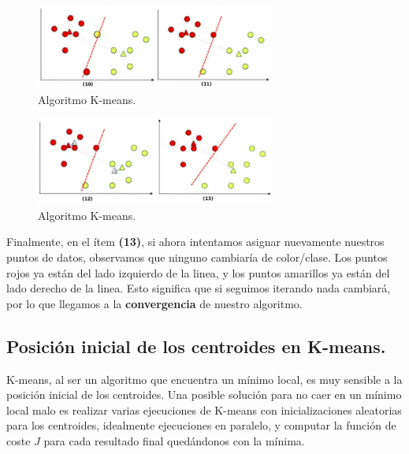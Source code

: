 \documentclass[12pt,a4paper]{article}
\begin{document}
\begin{sloppypar}
\begin{figure}[H]    %
 \centering
 \includegraphics[width=0.7\textwidth]{images/K_Means_5.png}
 \captionsetup{justification=centering,margin=2cm}
 \caption{Algoritmo K-means.}
\end{figure}

\begin{figure}[H]    %
 \centering
 \includegraphics[width=0.7\textwidth]{images/K_Means_6.png}
 \captionsetup{justification=centering,margin=2cm}
 \caption{Algoritmo K-means.}
\end{figure}

Finalmente, en el ítem \textbf{(13)}, si ahora intentamos asignar nuevamente nuestros puntos de datos, observamos que ninguno cambiaría de color/clase. Los puntos rojos ya están del lado izquierdo de la linea, y los puntos amarillos ya están del lado derecho de la linea. Esto significa que si seguimos iterando nada cambiará, por lo que llegamos a la \textbf{convergencia} de nuestro algoritmo.

\cleardoublepage

\subsection{Posición inicial de los centroides en K-means.}\label{anexo_pos_inic_centroides}

K-means, al ser un algoritmo que encuentra un mínimo local, es muy sensible a la posición inicial de los centroides. Una posible solución para no caer en un mínimo local malo es realizar varias ejecuciones de K-means con inicializaciones aleatorias para los centroides, idealmente ejecuciones en paralelo, y computar la función de coste $J$ para cada resultado final quedándonos con la mínima. 


\end{sloppypar}
\end{document}
